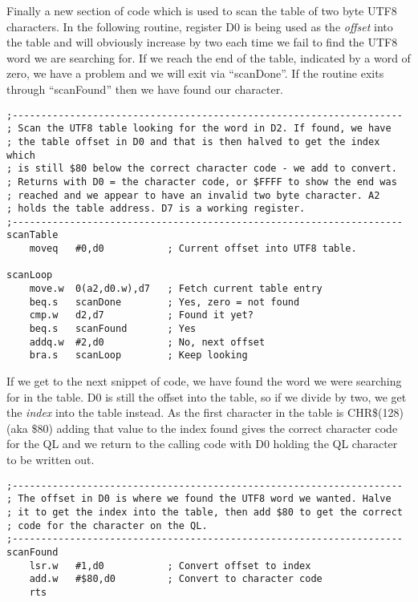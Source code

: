 Finally a new section of code which is used to scan the table of two
byte UTF8 characters. In the following routine, register D0 is being
used as the \emph{offset} into the table and will obviously increase
by two each time we fail to find the UTF8 word we are searching for.
If we reach the end of the table, indicated by a word of zero, we
have a problem and we will exit via ``scanDone''. If the routine
exits through ``scanFound'' then we have found our character.

\begin{lstlisting}[firstnumber=last,caption={Utf82Ql: Scanning for UTF8 words}]
;--------------------------------------------------------------------
; Scan the UTF8 table looking for the word in D2. If found, we have
; the table offset in D0 and that is then halved to get the index which
; is still $80 below the correct character code - we add to convert.
; Returns with D0 = the character code, or $FFFF to show the end was
; reached and we appear to have an invalid two byte character. A2
; holds the table address. D7 is a working register.
;--------------------------------------------------------------------
scanTable
    moveq   #0,d0           ; Current offset into UTF8 table.

scanLoop
    move.w  0(a2,d0.w),d7   ; Fetch current table entry
    beq.s   scanDone        ; Yes, zero = not found
    cmp.w   d2,d7           ; Found it yet?
    beq.s   scanFound       ; Yes
    addq.w  #2,d0           ; No, next offset
    bra.s   scanLoop        ; Keep looking
\end{lstlisting}

If we get to the next snippet of code, we have found the word we were
searching for in the table. D0 is still the offset into the table,
so if we divide by two, we get the \emph{index} into the table instead.
As the first character in the table is CHR\$(128) (aka \$80) adding
that value to the index found gives the correct character code for
the QL and we return to the calling code with D0 holding the QL character
to be written out.

\begin{lstlisting}[firstnumber=last,caption={Utf82Ql: UTF8 character found}]
;--------------------------------------------------------------------
; The offset in D0 is where we found the UTF8 word we wanted. Halve 
; it to get the index into the table, then add $80 to get the correct 
; code for the character on the QL.
;--------------------------------------------------------------------
scanFound
    lsr.w   #1,d0           ; Convert offset to index
    add.w   #$80,d0         ; Convert to character code
    rts
\end{lstlisting}

